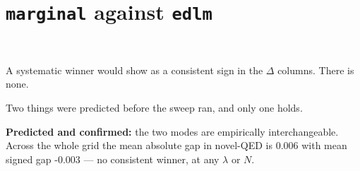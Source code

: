 \documentclass[11pt]{article}
\begin{document}
\section{\texttt{marginal} against \texttt{edlm}}
\begin{table}[htbp]
\centering
\small
{}
\\[0.4em] \begin{minipage}{0.92\textwidth}\footnotesize A systematic winner would show as a consistent sign in the $\Delta$ columns. There is none.\end{minipage}
\caption{\texttt{marginal} minus \texttt{edlm}, averaged over the five $N$ at each $\lambda$. $|\Delta|$ is the typical size of the gap, $\Delta$ its sign.}
\label{tab:modes-qed}
\end{table}


Two things were predicted before the sweep ran, and only one holds.

\textbf{Predicted and confirmed:} the two modes are empirically
interchangeable. Across the whole grid the mean absolute gap in novel-QED is
0.006 with mean signed gap
-0.003 --- no consistent winner, at any $\lambda$ or $N$.
\end{document}
